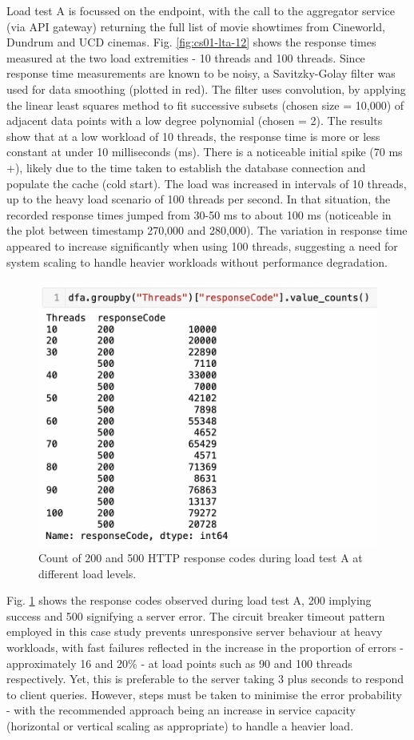 Load test A is focussed on the  endpoint, with the call to the aggregator service (via API gateway) returning the full list of movie showtimes from Cineworld, Dundrum and UCD cinemas. Fig. \ref{fig:cs01-lta-12} shows the response times measured at the two load extremities - 10 threads and 100 threads. Since response time measurements are known to be noisy, a Savitzky-Golay filter was used for data smoothing (plotted in red). The filter uses convolution, by applying the linear least squares method to fit successive subsets (chosen size = 10,000) of adjacent data points with a low degree polynomial (chosen = 2). The results show that at a low workload of 10 threads, the response time is more or less constant at under 10 milliseconds (ms). There is a noticeable initial spike (70 ms +), likely due to the time taken to establish the database connection and populate the cache (cold start). The load was increased in intervals of 10 threads, up to the heavy load scenario of 100 threads per second. In that situation, the recorded response times jumped from 30-50 ms to about 100 ms (noticeable in the plot between timestamp 270,000 and 280,000). The variation in response time appeared to increase significantly when using 100 threads, suggesting a need for system scaling to handle heavier workloads without performance degradation.

\begin{figure}[H]
  \centering
  \includegraphics[width=0.6\linewidth]{./assets/images/case-studies/cs01-lta-3.png}
  \caption{Count of 200 and 500 HTTP response codes during load test A at different load levels.}
  \label{fig:cs01-lta-3}
\end{figure}

Fig. \ref{fig:cs01-lta-3} shows the response codes observed during load test A, 200 implying success and 500 signifying a server error. The circuit breaker timeout pattern employed in this case study prevents unresponsive server behaviour at heavy workloads, with fast failures reflected in the increase in the proportion of errors - approximately 16 and 20\% - at load points such as 90 and 100 threads respectively. Yet, this is preferable to the server taking 3 plus seconds to respond to client queries. However, steps must be taken to minimise the error probability - with the recommended approach being an increase in service capacity (horizontal or vertical scaling as appropriate) to handle a heavier load.

